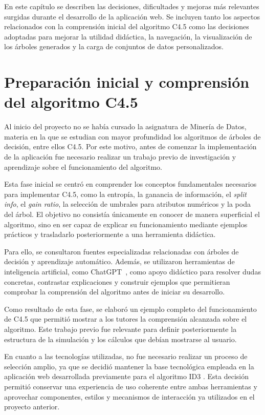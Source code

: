 \label{aspectos_relevantes}

En este capítulo se describen las decisiones, dificultades y mejoras más relevantes surgidas durante el desarrollo de la aplicación web. Se incluyen tanto los aspectos relacionados con la comprensión inicial del algoritmo C4.5 como las decisiones adoptadas para mejorar la utilidad didáctica, la navegación, la visualización de los árboles generados y la carga de conjuntos de datos personalizados.

\section{Preparación inicial y comprensión del algoritmo C4.5}

Al inicio del proyecto no se había cursado la asignatura de Minería de Datos, materia en la que se estudian con mayor profundidad los algoritmos de árboles de decisión, entre ellos C4.5. Por este motivo, antes de comenzar la implementación de la aplicación fue necesario realizar un trabajo previo de investigación y aprendizaje sobre el funcionamiento del algoritmo.

Esta fase inicial se centró en comprender los conceptos fundamentales necesarios para implementar C4.5, como la entropía, la ganancia de información, el \textit{split info}, el \textit{gain ratio}, la selección de umbrales para atributos numéricos y la poda del árbol. El objetivo no consistía únicamente en conocer de manera superficial el algoritmo, sino en ser capaz de explicar su funcionamiento mediante ejemplos prácticos y trasladarlo posteriormente a una herramienta didáctica.

Para ello, se consultaron fuentes especializadas relacionadas con árboles de decisión y aprendizaje automático. Además, se utilizaron herramientas de inteligencia artificial, como ChatGPT~\cite{chatgpt}, como apoyo didáctico para resolver dudas concretas, contrastar explicaciones y construir ejemplos que permitieran comprobar la comprensión del algoritmo antes de iniciar su desarrollo.

Como resultado de esta fase, se elaboró un ejemplo completo del funcionamiento de C4.5 que permitió mostrar a los tutores la comprensión alcanzada sobre el algoritmo. Este trabajo previo fue relevante para definir posteriormente la estructura de la simulación y los cálculos que debían mostrarse al usuario.

En cuanto a las tecnologías utilizadas, no fue necesario realizar un proceso de selección amplio, ya que se decidió mantener la base tecnológica empleada en la aplicación web desarrollada previamente para el algoritmo ID3 \cite{drefs2026DecisionTreeSimulator}. Esta decisión permitió conservar una experiencia de uso coherente entre ambas herramientas y aprovechar componentes, estilos y mecanismos de interacción ya utilizados en el proyecto anterior.

